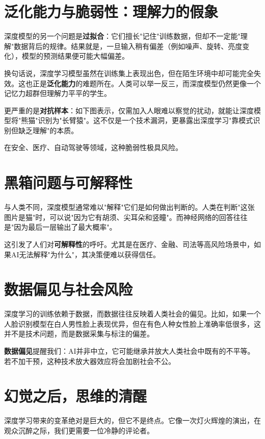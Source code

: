 \section*{泛化能力与脆弱性：理解力的假象}

深度模型的另一个问题是\textbf{过拟合}：它们擅长"记住"训练数据，但却不一定能"理解"数据背后的规律。结果就是，一旦输入稍有偏差（例如噪声、旋转、亮度变化），模型的预测结果便可能大幅偏差。

换句话说，深度学习模型虽然在训练集上表现出色，但在陌生环境中却可能完全失效。这也正是\textbf{泛化能力}的难题所在。人类可以举一反三，而深度模型仍然更像一个记忆力超群但理解力平平的学生。

更严重的是\textbf{对抗样本}：如下图表示，仅需加入人眼难以察觉的扰动，就能让深度模型将"熊猫"识别为"长臂猿"。这不仅是一个技术漏洞，更暴露出深度学习"靠模式识别但缺乏理解"的本质。

在安全、医疗、自动驾驶等领域，这种脆弱性极具风险。

\section*{黑箱问题与可解释性}

与人类不同，深度模型通常难以"解释"它们是如何做出判断的。人类在判断"这张图片是猫"时，可以说"因为它有胡须、尖耳朵和竖瞳"。而神经网络的回答往往是"因为最后一层输出了最大概率"。

这引发了人们对\textbf{可解释性}的呼吁。尤其是在医疗、金融、司法等高风险场景中，如果AI无法解释"为什么"，其决策便难以获得信任。

\section*{数据偏见与社会风险}

深度学习的训练依赖于数据，而数据往往反映着人类社会的偏见。比如，如果一个人脸识别模型在白人男性脸上表现优异，但在有色人种女性脸上准确率低很多，这并不是技术问题，而是数据采集与标注的偏差。

\textbf{数据偏见}提醒我们：AI并非中立，它可能继承并放大人类社会中既有的不平等。若不加干预，这种技术放大器效应将会加剧社会不公。

\section*{幻觉之后，思维的清醒}

深度学习带来的变革绝对是巨大的，但它不是终点。它像一次灯火辉煌的演出，在观众沉醉之际，我们更需要一位冷静的评论者。

